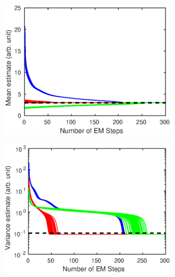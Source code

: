 \documentclass[12pt]{report}
\begin{document}
\begin{figure}
	\centering
	\begin{subfigure}{0.45\textwidth}
		\includegraphics[width=\textwidth]{figures/hierarchicalModel/EM_initial_mean.eps}
	\end{subfigure}
	\begin{subfigure}{0.45\textwidth}
		\includegraphics[width=\textwidth]{figures/hierarchicalModel/EM_initial_var.eps}
	\end{subfigure}
	\begin{subfigure}{0.45\textwidth}

\end{subfigure}
\end{figure}
\end{document}
